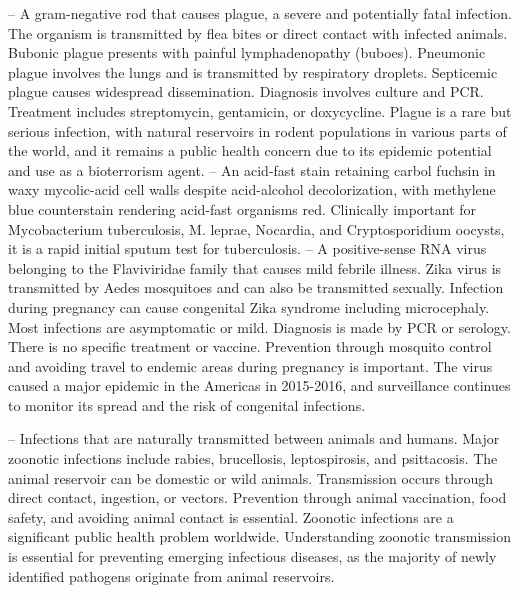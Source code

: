 -- A gram-negative rod that causes plague, a severe and potentially fatal infection. The organism is transmitted by flea bites or direct contact with infected animals. Bubonic plague presents with painful lymphadenopathy (buboes). Pneumonic plague involves the lungs and is transmitted by respiratory droplets. Septicemic plague causes widespread dissemination. Diagnosis involves culture and PCR. Treatment includes streptomycin, gentamicin, or doxycycline. Plague is a rare but serious infection, with natural reservoirs in rodent populations in various parts of the world, and it remains a public health concern due to its epidemic potential and use as a bioterrorism agent.
-- An acid-fast stain retaining carbol fuchsin in waxy mycolic-acid cell walls despite acid-alcohol decolorization, with methylene blue counterstain rendering acid-fast organisms red. Clinically important for Mycobacterium tuberculosis, M. leprae, Nocardia, and Cryptosporidium oocysts, it is a rapid initial sputum test for tuberculosis.
-- A positive-sense RNA virus belonging to the Flaviviridae family that causes mild febrile illness. Zika virus is transmitted by Aedes mosquitoes and can also be transmitted sexually. Infection during pregnancy can cause congenital Zika syndrome including microcephaly. Most infections are asymptomatic or mild. Diagnosis is made by PCR or serology. There is no specific treatment or vaccine. Prevention through mosquito control and avoiding travel to endemic areas during pregnancy is important. The virus caused a major epidemic in the Americas in 2015-2016, and surveillance continues to monitor its spread and the risk of congenital infections.

-- Infections that are naturally transmitted between animals and humans. Major zoonotic infections include rabies, brucellosis, leptospirosis, and psittacosis. The animal reservoir can be domestic or wild animals. Transmission occurs through direct contact, ingestion, or vectors. Prevention through animal vaccination, food safety, and avoiding animal contact is essential. Zoonotic infections are a significant public health problem worldwide. Understanding zoonotic transmission is essential for preventing emerging infectious diseases, as the majority of newly identified pathogens originate from animal reservoirs.
